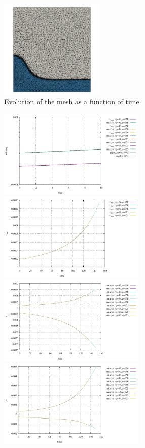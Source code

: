 \begin{center}
\includegraphics[width=5cm]{python_codes/fieldstone_93/results_exp4/gamma/mat499}\\
{\captionfont Evolution of the mesh as a function of time.}
\end{center} 



\begin{center}
\includegraphics[width=7cm]{python_codes/fieldstone_93/results_exp4/vrms_gamma}
\includegraphics[width=7cm]{python_codes/fieldstone_93/results_exp4/vrms_time}\\
\includegraphics[width=7cm]{python_codes/fieldstone_93/results_exp4/u_time}
\includegraphics[width=7cm]{python_codes/fieldstone_93/results_exp4/v_time}\\

\end{center}
